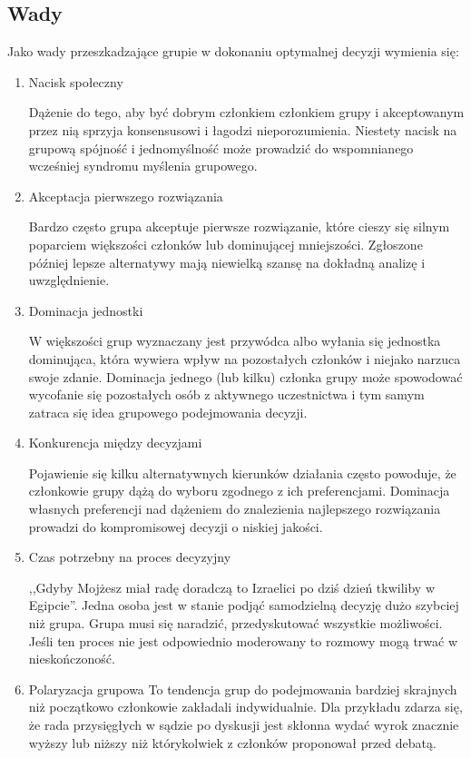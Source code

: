 \subsection{Wady}
Jako wady przeszkadzające grupie w dokonaniu optymalnej decyzji wymienia się:
\begin{enumerate}
  \item Nacisk społeczny
  
  Dążenie do tego, aby być dobrym członkiem członkiem grupy i akceptowanym przez nią sprzyja konsensusowi i łagodzi nieporozumienia. Niestety nacisk na grupową spójność i jednomyślność może prowadzić do wspomnianego wcześniej syndromu myślenia grupowego.
  
  \item Akceptacja pierwszego rozwiązania
  
  Bardzo często grupa akceptuje pierwsze rozwiązanie, które cieszy się silnym poparciem większości członków lub dominującej mniejszości. Zgłoszone później lepsze alternatywy mają niewielką szansę na dokładną analizę i uwzględnienie.
  
  \item Dominacja jednostki
  
  W większości grup wyznaczany jest przywódca albo wyłania się jednostka dominująca, która wywiera wpływ na pozostałych członków i niejako narzuca swoje zdanie. Dominacja jednego (lub kilku) członka grupy może spowodować wycofanie się pozostałych osób z aktywnego uczestnictwa i tym samym zatraca się idea grupowego podejmowania decyzji.
  
  \item Konkurencja między decyzjami
  
  Pojawienie się kilku alternatywnych kierunków działania często powoduje, że członkowie grupy dążą do wyboru zgodnego z ich preferencjami. Dominacja własnych preferencji nad dążeniem do znalezienia najlepszego rozwiązania prowadzi do kompromisowej decyzji o niskiej jakości.
  
  \item Czas potrzebny na proces decyzyjny
  
  ,,Gdyby Mojżesz miał radę doradczą to Izraelici po dziś dzień tkwiliby w
  Egipcie''. Jedna osoba jest w stanie podjąć samodzielną decyzję dużo szybciej
  niż grupa. Grupa musi się naradzić, przedyskutować wszystkie możliwości. 
  Jeśli ten proces nie jest odpowiednio moderowany to rozmowy mogą trwać w nieskończoność.

  \item Polaryzacja grupowa
  To tendencja grup do podejmowania bardziej skrajnych niż początkowo członkowie 
  zakładali indywidualnie. Dla przykładu zdarza się, że rada przysięgłych 
  w sądzie po dyskusji jest skłonna wydać wyrok znacznie wyższy lub niższy 
  niż którykolwiek z członków proponował przed debatą.

\end{enumerate}

